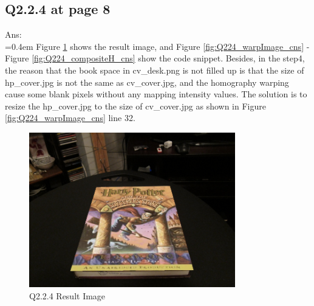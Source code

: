 \documentclass{article}
\begin{document}
	\newpage
	\subsection*{Q2.2.4 at page 8}
	Ans:\\
	\hangindent=0.4em \hspace{0.3em} Figure \ref{fig:Q224_result} shows the result image, and Figure \ref{fig:Q224_warpImage_cns} - Figure \ref{fig:Q224_compositeH_cns} show the code snippet. Besides, in the step4, the reason that the book space in cv\_desk.png is not filled up is that the size of hp\_cover.jpg is not the same as cv\_cover.jpg, and the homography warping cause some blank pixels without any mapping intensity values.
	The solution is to resize the hp\_cover.jpg to the size of cv\_cover.jpg as shown in Figure \ref{fig:Q224_warpImage_cns} line 32.
	\begin{figure}[H]		
	\centering
	\includegraphics[width=0.8\textwidth]{Q2_2_4_result.png}  %
	\caption{Q2.2.4 Result Image}
	\label{fig:Q224_result}
	\end{figure}	
\end{document}
